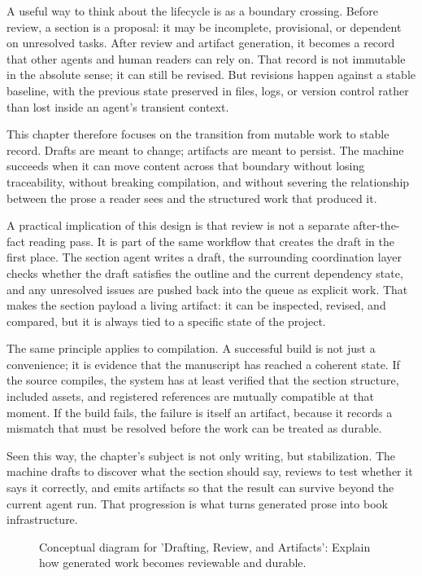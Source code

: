 \documentclass[11pt]{article}
\begin{document}
A useful way to think about the lifecycle is as a boundary crossing. Before review, a section is a proposal: it may be incomplete, provisional, or dependent on unresolved tasks. After review and artifact generation, it becomes a record that other agents and human readers can rely on. That record is not immutable in the absolute sense; it can still be revised. But revisions happen against a stable baseline, with the previous state preserved in files, logs, or version control rather than lost inside an agent's transient context.

This chapter therefore focuses on the transition from mutable work to stable record. Drafts are meant to change; artifacts are meant to persist. The machine succeeds when it can move content across that boundary without losing traceability, without breaking compilation, and without severing the relationship between the prose a reader sees and the structured work that produced it.

A practical implication of this design is that review is not a separate after-the-fact reading pass. It is part of the same workflow that creates the draft in the first place. The section agent writes a draft, the surrounding coordination layer checks whether the draft satisfies the outline and the current dependency state, and any unresolved issues are pushed back into the queue as explicit work. That makes the section payload a living artifact: it can be inspected, revised, and compared, but it is always tied to a specific state of the project.

The same principle applies to compilation. A successful build is not just a convenience; it is evidence that the manuscript has reached a coherent state. If the source compiles, the system has at least verified that the section structure, included assets, and registered references are mutually compatible at that moment. If the build fails, the failure is itself an artifact, because it records a mismatch that must be resolved before the work can be treated as durable.

Seen this way, the chapter's subject is not only writing, but stabilization. The machine drafts to discover what the section should say, reviews to test whether it says it correctly, and emits artifacts so that the result can survive beyond the current agent run. That progression is what turns generated prose into book infrastructure.

\begin{figure}[htbp]
\centering

\caption{Conceptual diagram for 'Drafting, Review, and Artifacts': Explain how generated work becomes reviewable and durable.}
\end{figure}


\end{document}
